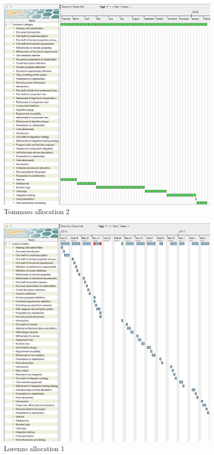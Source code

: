 \begin{figure}[H]
	\centerline{
		\includegraphics[width=500px]{../Datas/images/resource-tommaso-2.png}
	}
	\caption{Tommaso allocation 2}
		\label{fig:tasks-1}
\end{figure}

\begin{figure}[H]
	\centerline{
		\includegraphics[width=500px]{../Datas/images/resource-lorenzo-1.png}
	}
	\caption{Lorenzo allocation 1}
		\label{fig:tasks-1}
\end{figure}

